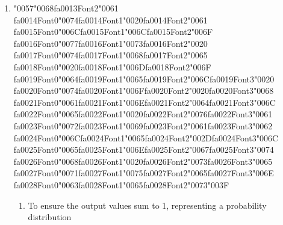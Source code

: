 \documentclass[12pt]{article}
\begin{document}
\begin{enumerate}[label=Q\arabic*.]
\begin{enumerate}[label=(\Alph*)]
\end{enumerate}
\item {\char"0057}{\char"0068}{\csname fa0013Font2\endcsname\char"0061} {\csname fa0014Font0\endcsname\char"0074}{\csname fa0014Font1\endcsname\char"0020}{\csname fa0014Font2\endcsname\char"0061} {\csname fa0015Font0\endcsname\char"006C}{\csname fa0015Font1\endcsname\char"006C}{\csname fa0015Font2\endcsname\char"006F} {\csname fa0016Font0\endcsname\char"0077}{\csname fa0016Font1\endcsname\char"0073}{\csname fa0016Font2\endcsname\char"0020} {\csname fa0017Font0\endcsname\char"0074}{\csname fa0017Font1\endcsname\char"0068}{\csname fa0017Font2\endcsname\char"0065} {\csname fa0018Font0\endcsname\char"0020}{\csname fa0018Font1\endcsname\char"006D}{\csname fa0018Font2\endcsname\char"006F} {\csname fa0019Font0\endcsname\char"0064}{\csname fa0019Font1\endcsname\char"0065}{\csname fa0019Font2\endcsname\char"006C}{\csname fa0019Font3\endcsname\char"0020} {\csname fa0020Font0\endcsname\char"0074}{\csname fa0020Font1\endcsname\char"006F}{\csname fa0020Font2\endcsname\char"0020}{\csname fa0020Font3\endcsname\char"0068} {\csname fa0021Font0\endcsname\char"0061}{\csname fa0021Font1\endcsname\char"006E}{\csname fa0021Font2\endcsname\char"0064}{\csname fa0021Font3\endcsname\char"006C} {\csname fa0022Font0\endcsname\char"0065}{\csname fa0022Font1\endcsname\char"0020}{\csname fa0022Font2\endcsname\char"0076}{\csname fa0022Font3\endcsname\char"0061} {\csname fa0023Font0\endcsname\char"0072}{\csname fa0023Font1\endcsname\char"0069}{\csname fa0023Font2\endcsname\char"0061}{\csname fa0023Font3\endcsname\char"0062} {\csname fa0024Font0\endcsname\char"006C}{\csname fa0024Font1\endcsname\char"0065}{\csname fa0024Font2\endcsname\char"002D}{\csname fa0024Font3\endcsname\char"006C} {\csname fa0025Font0\endcsname\char"0065}{\csname fa0025Font1\endcsname\char"006E}{\csname fa0025Font2\endcsname\char"0067}{\csname fa0025Font3\endcsname\char"0074} {\csname fa0026Font0\endcsname\char"0068}{\csname fa0026Font1\endcsname\char"0020}{\csname fa0026Font2\endcsname\char"0073}{\csname fa0026Font3\endcsname\char"0065} {\csname fa0027Font0\endcsname\char"0071}{\csname fa0027Font1\endcsname\char"0075}{\csname fa0027Font2\endcsname\char"0065}{\csname fa0027Font3\endcsname\char"006E} {\csname fa0028Font0\endcsname\char"0063}{\csname fa0028Font1\endcsname\char"0065}{\csname fa0028Font2\endcsname\char"0073}{\char"003F}
\begin{enumerate}[label=(\Alph*)]
    \item To ensure the output values sum to 1, representing a probability distribution

\end{enumerate}
\end{enumerate}
\end{document}
